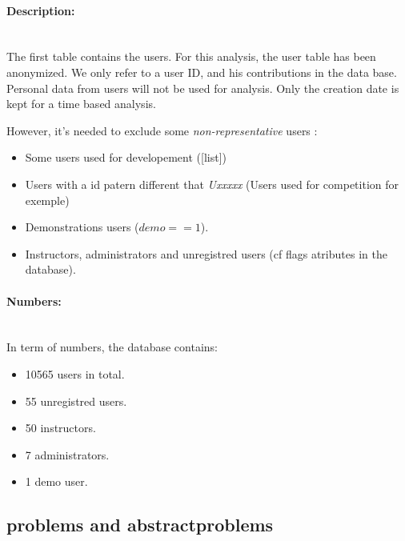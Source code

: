 \documentclass[../main.tex]{subfiles}
\begin{document}
\paragraph{Description:}~\\ %
The first table contains the users. For this analysis, the user table has been anonymized. We only refer to a user ID, and his contributions in the data base. Personal data from users will not be used for analysis. Only the creation date is kept for a time based analysis.  

However, it's needed to exclude some \emph{non-representative} users :

\begin{itemize}
	\setlength\itemsep{0em}
	\item Some users used for developement ([list])
	\item Users with a id patern different that \emph{Uxxxxx} (Users used for competition for exemple)
	\item Demonstrations users ($demo == 1 $).
	\item Instructors, administrators and unregistred users (cf flags atributes in the database).
\end{itemize}

\paragraph{Numbers:}~\\ %
In term of numbers, the database contains:
\begin{itemize}
	\setlength\itemsep{0em}
	\item 10565 users in total.
	\item 55 unregistred users.
	\item 50 instructors.
	\item 7 administrators.
	\item 1 demo user.
\end{itemize}


\newpage
\subsection{problems and abstractproblems} %
\label{sub:problems}
\begin{figure}
  \vspace{-20pt}
  \begin{center}
  \end{center}
  \vspace{-10pt}
\end{figure}
\end{document}
